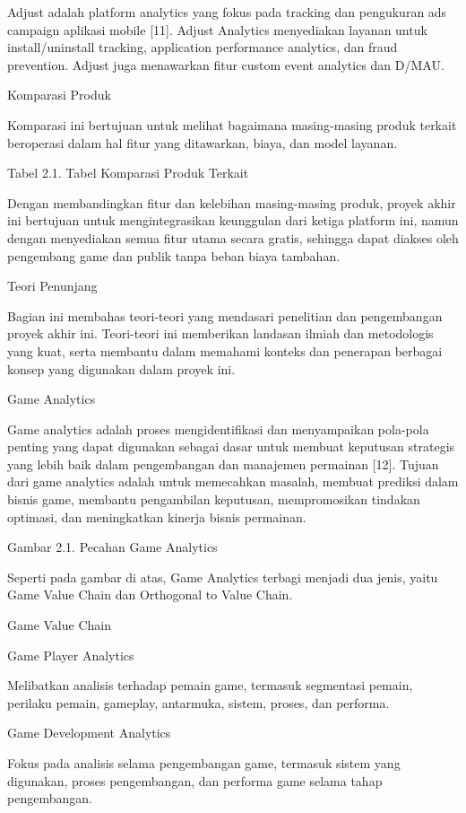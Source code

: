 Adjust adalah platform analytics yang fokus pada tracking dan pengukuran ads campaign aplikasi mobile [11]. Adjust Analytics menyediakan layanan untuk install/uninstall tracking, application performance analytics, dan fraud prevention. Adjust juga menawarkan fitur custom event analytics dan D/MAU.

Komparasi Produk

Komparasi ini bertujuan untuk melihat bagaimana masing-masing produk terkait beroperasi dalam hal fitur yang ditawarkan, biaya, dan model layanan.

Tabel 2.1. Tabel Komparasi Produk Terkait

Dengan membandingkan fitur dan kelebihan masing-masing produk, proyek akhir ini bertujuan untuk mengintegrasikan keunggulan dari ketiga platform ini, namun dengan menyediakan semua fitur utama secara gratis, sehingga dapat diakses oleh pengembang game dan publik tanpa beban biaya tambahan.

Teori Penunjang

Bagian ini membahas teori-teori yang mendasari penelitian dan pengembangan proyek akhir ini. Teori-teori ini memberikan landasan ilmiah dan metodologis yang kuat, serta membantu dalam memahami konteks dan penerapan berbagai konsep yang digunakan dalam proyek ini.

Game Analytics

Game analytics adalah proses mengidentifikasi dan menyampaikan pola-pola penting yang dapat digunakan sebagai dasar untuk membuat keputusan strategis yang lebih baik dalam pengembangan dan manajemen permainan [12]. Tujuan dari game analytics adalah untuk memecahkan masalah, membuat prediksi dalam bisnis game, membantu pengambilan keputusan, mempromosikan tindakan optimasi, dan meningkatkan kinerja bisnis permainan.

Gambar 2.1. Pecahan Game Analytics

Seperti pada gambar di atas, Game Analytics terbagi menjadi dua jenis, yaitu Game Value Chain dan Orthogonal to Value Chain.

Game Value Chain

Game Player Analytics

Melibatkan analisis terhadap pemain game, termasuk segmentasi pemain, perilaku pemain, gameplay, antarmuka, sistem, proses, dan performa.

Game Development Analytics

Fokus pada analisis selama pengembangan game, termasuk sistem yang digunakan, proses pengembangan, dan performa game selama tahap pengembangan.

